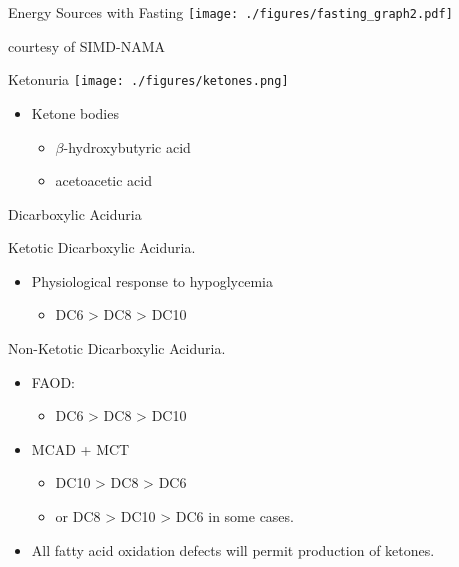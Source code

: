 \documentclass[presentation, smaller]{beamer}
\begin{document}
\begin{frame}[label={sec:orgheadline8}]{Energy Sources with Fasting}
\texttt{[image: ./figures/fasting\_graph2.pdf]}

\tiny
courtesy of SIMD-NAMA
\end{frame}

\begin{frame}[label={sec:orgheadline9}]{Ketonuria}
\texttt{[image: ./figures/ketones.png]}

\begin{itemize}
\item Ketone bodies
\begin{itemize}
\item \(\beta\)-hydroxybutyric acid
\item acetoacetic acid
\end{itemize}
\end{itemize}
\end{frame}



\begin{frame}[label={sec:orgheadline10}]{Dicarboxylic Aciduria}
\begin{block}{Ketotic Dicarboxylic Aciduria.}
\begin{itemize}
\item Physiological response to hypoglycemia
\begin{itemize}
\item DC6 > DC8 > DC10
\end{itemize}
\end{itemize}
\end{block}

\begin{block}{Non-Ketotic Dicarboxylic Aciduria.}
\begin{itemize}
\item FAOD:
\begin{itemize}
\item DC6 > DC8 > DC10
\end{itemize}
\item MCAD + MCT
\begin{itemize}
\item DC10 > DC8 > DC6
\item or DC8 > DC10 > DC6 in some cases.
\end{itemize}

\item All fatty acid oxidation defects will permit production of ketones.
\end{itemize}
\end{block}
\end{frame}
\end{document}

